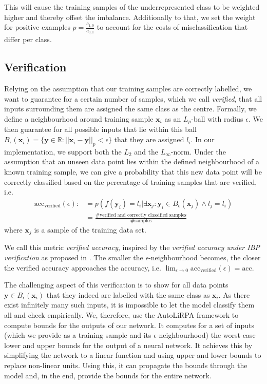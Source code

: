 \documentclass[acmsmall,nonacm]{acmart}
\begin{document}
This will cause the training samples of the underrepresented class to be weighted higher and thereby offset the imbalance. Additionally to that, we set the weight for positive examples $p = \frac{c_{1,0}}{c_{0,1}}$ to account for the costs of misclassification that differ per class. 

\subsection{Verification} \label{ssec:verification}

Relying on the assumption that our training samples are correctly labelled, we want to guarantee for a certain number of samples, which we call \textit{verified}, that all inputs surrounding them are assigned the same class as the centre. Formally, we define a neighbourhood around training sample $\mathbf{x}_i$ as an $L_p$-ball with radius $\epsilon$. We then guarantee for all possible inputs that lie within this ball $B_\epsilon(\mathbf{x}_i) = \{\mathbf{y} \in \mathbb{R}: ||\mathbf{x}_i - \mathbf{y}||_p < \epsilon \}$ that they are assigned $l_i$. In our implementation, we support both the $L_2$ and the $L_\infty$-norm. Under the assumption that an unseen data point lies within the defined neighbourhood of a known training sample, we can give a probability that this new data point will be correctly classified based on the percentage of training samples that are verified, i.e.
\begin{align}
	\text{acc}_\text{verified}(\epsilon) :&= p(f(\mathbf{y}_i) = l_i | \exists \mathbf{x}_j : \mathbf{y}_i \in B_{\epsilon} (\mathbf{x}_j) \land l_j = l_i ) \\
	&= \frac{\text{\# verified and correctly classified samples}}{\text{\# samples}}
\end{align}
where $\mathbf{x}_j$ is a sample of the training data set.

We call this metric \textit{verified accuracy}, inspired by the \textit{verified accuracy under IBP verification} as proposed in \cite{huang2019achieving}. The smaller the $\epsilon$-neighbourhood becomes, the closer the verified accuracy approaches the accuracy, i.e. $\lim_{\epsilon \to 0} \text{acc}_{\text{verified}} (\epsilon) = \text{acc}$.


The challenging aspect of this verification is to show for all data points $\mathbf{y} \in B_\epsilon(\mathbf{x}_i)$ that they indeed are labelled with the same class as $\mathbf{x}_i$. As there exist infinitely many such inputs, it is impossible to let the model classify them all and check empirically. We, therefore, use the AutoLiRPA framework \cite{xu2020autoLiRPA} to compute bounds for the outputs of our network. It computes for a set of inputs (which we provide as a training sample and its $\epsilon$-neighbourhood) the worst-case lower and upper bounds for the output of a neural network. It achieves this by simplifying the network to a linear function and using upper and lower bounds to replace non-linear units. Using this, it can propagate the bounds through the model and, in the end, provide the bounds for the entire network.
\end{document}
